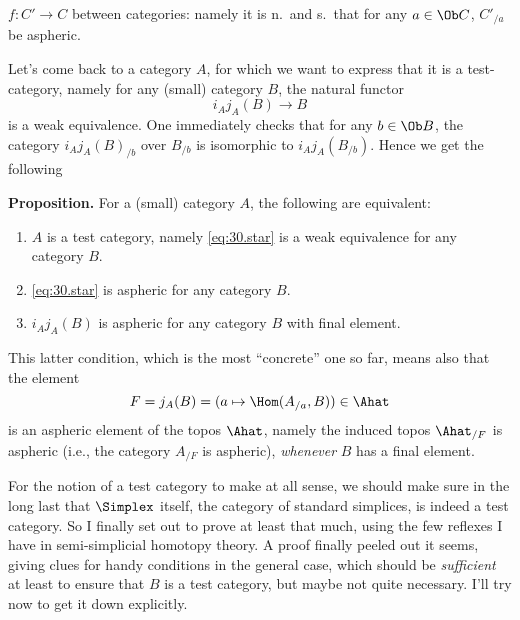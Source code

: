 $f: C'\to C$ between categories: namely it is n.\ and s.\ that for any
$a\in\Ob C$, $C'_{/a}$ be aspheric.

Let's come back to a category $A$, for which we want to express that
it is a test-category, namely for any (small) category $B$, the natural
functor
\begin{equation}
  \label{eq:30.star}
  i_Aj_A(B) \to B \tag{*}
\end{equation}
is a weak equivalence. One immediately checks that for any $b\in\Ob
B$, the category $i_Aj_A(B)_{/b}$ over $B_{/b}$ is isomorphic to
$i_Aj_A(B_{/b})$. Hence we get the following

\noindent\textbf{Proposition.} For a (small) category $A$, the following are
equivalent:
\begin{enumerate}[label=(\roman*)]
\item\label{it:30.i}
  $A$ is a test category, namely \eqref{eq:30.star} is a weak
  equivalence for any category $B$.
\item\label{it:30.ii}
  \eqref{eq:30.star} is aspheric for any category $B$.
\item\label{it:30.iii}
  $i_Aj_A(B)$ is aspheric for any category $B$ with final element.
\end{enumerate}

This latter condition, which is the most ``concrete'' one so far,
means also that the element
\[ F = j_A(B) = (a \mapsto \Hom(A_{/a}, B)) \in \Ahat\]
is an aspheric element of the topos $\Ahat$, namely the induced
topos $\Ahat_{/F}$ is aspheric (i.e., the category $A_{/F}$ is
aspheric), \emph{whenever} $B$ has a final element.

\label{sec:31}%
For the notion of a test category to make at all sense, we should make
sure in the long last that $\Simplex$ itself, the category of standard
simplices, is indeed a test category. So I finally set out to prove at
least that much, using the few reflexes I have in semi-simplicial
homotopy theory. A proof finally peeled out it seems, giving clues for
handy conditions in the general case, which should be
\emph{sufficient} at least to ensure that $B$ is a test category, but
maybe not quite necessary. I'll try now to get it down explicitly.

